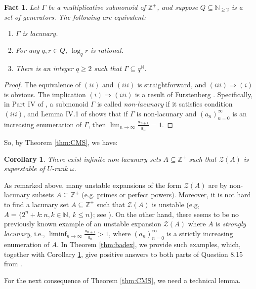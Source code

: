\documentclass{amsart}
\def\seq{\subseteq}
\newcommand{\cZ}{\mathcal{Z}}
\def\N{\mathbb N}
\def\Z{\mathbb Z}
\newtheorem{corollary}[theorem]{Corollary}
\newtheorem{fact}[theorem]{Fact}
\theoremstyle{definition}
\begin{document}
\begin{fact}\label{fact:lacunary}
Let $\Gamma$ be a multiplicative submonoid of $\Z^+$, and suppose $Q\seq\N_{\geq 2}$ is a set of generators. The following are equivalent:
\begin{enumerate}[$(i)$]
\item $\Gamma$ is lacunary.
\item For any $q,r\in Q$, $\log_q r$ is rational.
\item There is an integer $q\geq 2$ such that $\Gamma\seq q^{\N}$.
\end{enumerate}
\end{fact}
\begin{proof}
The equivalence of $(ii)$ and $(iii)$ is straightforward, and $(iii)\Rightarrow (i)$ is obvious. The implication $(i)\Rightarrow (iii)$ is a result of Furstenberg \cite{FurstLac}. Specifically, in Part IV of \cite{FurstLac}, a submonoid $\Gamma$ is called \emph{non-lacunary} if it satisfies condition $(iii)$, and Lemma IV.1 of \cite{FurstLac} shows that if $\Gamma$ is non-lacunary and $(a_n)_{n=0}^\infty$ is an increasing enumeration of $\Gamma$, then $\lim_{n\to\infty}\frac{a_{n+1}}{a_n}=1$.
\end{proof}

So, by Theorem \ref{thm:CMS}, we have:

\begin{corollary}\label{cor:lacunary}
There exist infinite non-lacunary sets $A\seq\Z^+$ such that $\cZ(A)$ is superstable of $U$-rank $\omega$.
\end{corollary}


As remarked above, many  unstable expansions of the form $\cZ(A)$ are by non-lacunary subsets $A\seq\Z^+$ (e.g. primes or perfect powers). Moreover, it is not hard to find a lacunary set $A\seq\Z^+$ such that $\cZ(A)$ is unstable (e.g, $A=\{2^n+k:n,k\in\N,~k\leq n\}$; see \cite[Proposition 8.10]{CoSS}). On the other hand, there seems to be no previously known example of an unstable expansion $\cZ(A)$ where $A$ is \emph{strongly lacunary}, i.e., $\liminf_{n\to\infty}\frac{a_{n+1}}{a_n}>1$, where $(a_n)_{n=0}^\infty$ is a strictly increasing enumeration of $A$. In Theorem \ref{thm:badex}, we provide such examples, which, together with Corollary \ref{cor:lacunary}, give positive answers to both parts of Question 8.15 from \cite{CoSS}.

For the next consequence of Theorem \ref{thm:CMS}, we need a technical lemma.
\end{document}
